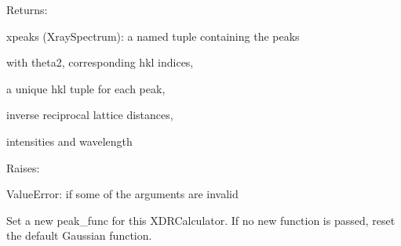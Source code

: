 \documentclass[letterpaper,10pt,english]{sphinxmanual}
\begin{document}
\begin{fulllineitems}
\begin{fulllineitems}
\begin{DUlineblock}{0em}
\item[] Returns:
\item[]
\begin{DUlineblock}{\DUlineblockindent}
\item[] xpeaks (XraySpectrum): a named tuple containing the peaks
\item[]
\begin{DUlineblock}{\DUlineblockindent}
\item[] with theta2, corresponding hkl indices,
\item[] a unique hkl tuple for each peak,
\item[] inverse reciprocal lattice distances,
\item[] intensities and wavelength
\end{DUlineblock}
\end{DUlineblock}
\end{DUlineblock}

\begin{DUlineblock}{0em}
\item[] Raises:
\item[]
\begin{DUlineblock}{\DUlineblockindent}
\item[] ValueError: if some of the arguments are invalid
\end{DUlineblock}
\end{DUlineblock}

\end{fulllineitems}


\begin{fulllineitems}
\label{doctree/soprano.calculate.xrd.xrd:soprano.calculate.xrd.xrd.XRDCalculator.set_peak_func}
Set a new peak\_func for this XDRCalculator. If no new function is
passed, reset the default Gaussian function.


\end{fulllineitems}
\end{fulllineitems}
\end{document}
